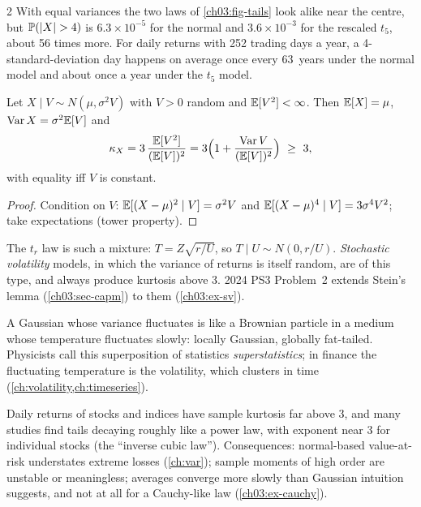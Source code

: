 \begin{paracol}{2}
With equal variances the two laws of \cref{ch03:fig-tails} look alike near the centre, but
$\Prob(|X|>4)$ is $6.3\times10^{-5}$ for the normal and $3.6\times10^{-3}$ for the rescaled $t_5$, about 56 times more.
For daily returns with 252 trading days a year, a 4-standard-deviation day happens on average once every
63~years under the normal model and about once a year under the $t_5$ model.

\begin{proposition}\label{ch03:prop-mixture}
Let $X\mid V\sim N(\mu,\sigma^2V)$ with $V>0$ random and $\mathbb{E}[V^2]<\infty$. Then $\mathbb{E}[X]=\mu$, $\operatorname{Var} X=\sigma^2\mathbb{E}[V]$ and
\[
  \kappa_X=3\,\frac{\mathbb{E}[V^2]}{(\mathbb{E}[V])^2}=3\Bigl(1+\frac{\operatorname{Var} V}{(\mathbb{E}[V])^2}\Bigr)\ \ge\ 3,
\]
with equality iff $V$ is constant.
\end{proposition}
\begin{proof}
Condition on $V$: $\mathbb{E}[(X-\mu)^2\mid V]=\sigma^2V$ and $\mathbb{E}[(X-\mu)^4\mid V]=3\sigma^4V^2$; take expectations (tower property).
\end{proof}
The $t_r$ law is such a mixture: $T=Z\sqrt{r/U}$, so $T\mid U\sim N(0,r/U)$. \emph{Stochastic volatility} models, in
which the variance of returns is itself random, are of this type, and always produce kurtosis above 3. 2024
PS3 Problem~2 extends Stein's lemma (\cref{ch03:sec-capm}) to them (\cref{ch03:ex-sv}).

\begin{intuition}[Superstatistics]
A Gaussian whose variance fluctuates is like a Brownian particle in a medium whose temperature fluctuates
slowly: locally Gaussian, globally fat-tailed. Physicists call this superposition of statistics
\emph{superstatistics}; in finance the fluctuating temperature is the volatility, which clusters in time
(\cref{ch:volatility,ch:timeseries}).
\end{intuition}

\begin{finance}
Daily returns of stocks and indices have sample kurtosis far above 3, and many studies find tails decaying
roughly like a power law, with exponent near 3 for individual stocks (the ``inverse cubic law''). Consequences:
normal-based value-at-risk understates extreme losses (\cref{ch:var}); sample moments of high order are
unstable or meaningless; averages converge more slowly than Gaussian intuition suggests, and not at all for a
Cauchy-like law (\cref{ch03:ex-cauchy}).
\end{finance}


\end{paracol}
